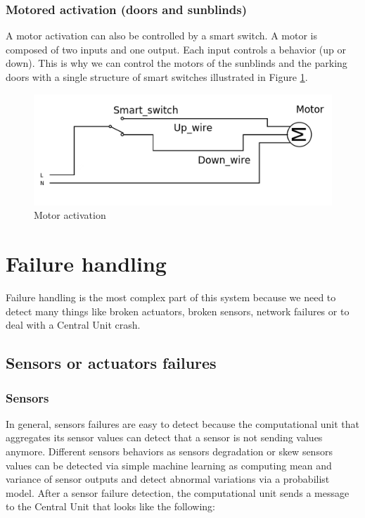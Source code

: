 \documentclass{acm_proc_article-sp}
\begin{document}
\subsubsection{Motored activation (doors and sunblinds)}
A motor activation can also be controlled by a smart switch.
A motor is composed of two inputs and one output. Each input controls a behavior (up or down).
This is why we can control the motors of the sunblinds and the parking doors with a single structure of smart switches illustrated in Figure \ref{motor}.
				\begin{figure}[htb]
  				\begin{center}
    				\includegraphics[width=\linewidth]{motor}
    				\caption{Motor activation \label{motor}}
  				\end{center}
				\end{figure}

\section{Failure handling}\label{failure_handling}
Failure handling is the most complex part of this system because we need to detect many things like broken actuators, broken sensors, 
network failures or to deal with a Central Unit crash.
\subsection{Sensors or actuators failures}
\subsubsection{Sensors}
In general, sensors failures are easy to detect because the computational unit that aggregates its sensor values can detect that a sensor is not sending values anymore. 
Different sensors behaviors as sensors degradation or skew sensors values can be detected via simple machine learning as computing mean and variance of sensor outputs and detect abnormal variations via a probabilist model.
After a sensor failure detection, the computational unit sends a message to the Central Unit that looks like the following: 
\end{document}
